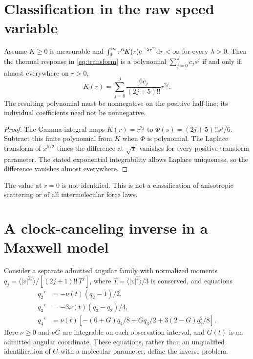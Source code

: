 \documentclass[11pt]{article}
\begin{document}
\section{Classification in the raw speed variable}
\begin{corollary}\label{cor:kernel}
Assume $K\geq0$ is measurable and
$\int_0^\infty r^6K(r)\mathrm e^{-\lambda r^2}\,\mathrm d r<\infty$ for every
$\lambda>0$. Then the thermal response in \eqref{eq:transform} is a
polynomial $\sum_{j=0}^Jc_js^j$ if and only if, almost everywhere on $r>0$,
\[
 K(r)=\sum_{j=0}^J\frac{6c_j}{(2j+5)!!}r^{2j}.
\]
The resulting polynomial must be nonnegative on the positive half-line;
its individual coefficients need not be nonnegative.
\end{corollary}
\begin{proof}
The Gamma integral maps $K(r)=r^{2j}$ to
$\Phi(s)=(2j+5)!!s^j/6$. Subtract this finite polynomial from $K$
when $\Phi$ is polynomial. The Laplace transform of
$x^{5/2}$ times the difference at $\sqrt{x}$ vanishes for every
positive transform parameter. The stated exponential integrability allows
Laplace uniqueness, so the difference vanishes almost everywhere.
\end{proof}
The value at $r=0$ is not identified. This is not a classification of
anisotropic scattering or of all intermolecular force laws.

\section{A clock-canceling inverse in a Maxwell model}
Consider a separate admitted angular family with normalized moments
$q_j=\langle|v|^{2j}\rangle/[(2j+1)!!\,T^j]$, where
$T=\langle|v|^2\rangle/3$ is conserved, and equations
\begin{align}
 q_2'&=-\nu(t)(q_2-1)/2,\nonumber\\
 q_3'&=-3\nu(t)(q_3-q_2)/4,\label{eq:maxwell}\\
 q_4'&=\nu(t)\left[-(6+G)q_4/8+Gq_3/2
                              +3(2-G)q_2^2/8\right].\nonumber
\end{align}
Here $\nu\geq0$ and $\nu G$ are integrable on each observation interval,
and $G(t)$ is an admitted angular coordinate.
These equations, rather than an unqualified identification of $G$ with
a molecular parameter, define the inverse problem.
\end{document}
